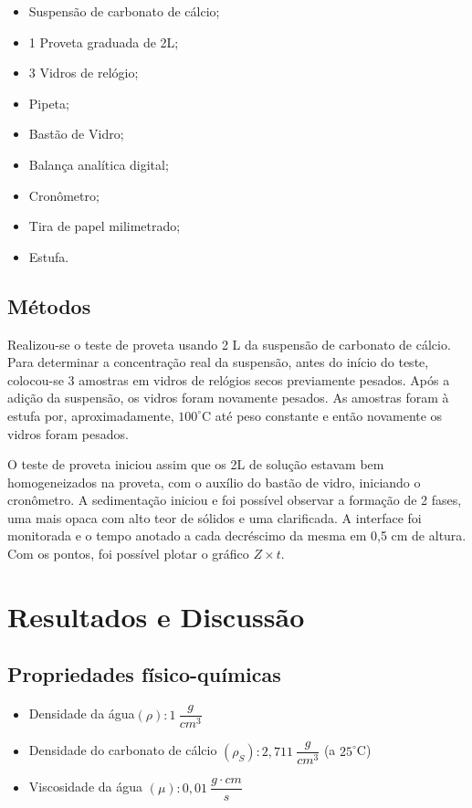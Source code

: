 \begin{itemize}
\item Suspensão de carbonato de cálcio;
\item 1 Proveta graduada de 2L;
\item 3 Vidros de relógio;
\item Pipeta;
\item Bastão de Vidro;
\item Balança analítica digital;
\item Cronômetro;
\item Tira de papel milimetrado;
\item Estufa.
\end{itemize}

\section{Métodos}

Realizou-se o teste de proveta usando 2 L da suspensão de carbonato de cálcio. Para determinar a concentração real da suspensão, antes do início do teste, colocou-se 3 amostras em vidros de relógios secos previamente pesados. Após a adição da suspensão, os vidros foram novamente pesados. As amostras foram à estufa por, aproximadamente, $ 100^{\circ} $C até peso constante e então novamente os vidros foram pesados.


O teste de proveta iniciou assim que os 2L de solução estavam bem homogeneizados na proveta, com o auxílio do bastão de vidro, iniciando o cronômetro. A sedimentação iniciou e foi possível observar a formação de 2 fases, uma mais opaca com alto teor de sólidos e uma clarificada. A interface foi monitorada e o tempo anotado a cada decréscimo da mesma em 0,5 cm de altura. Com os pontos, foi possível plotar o gráfico $ Z \times t $.




\chapter{Resultados e Discussão}

\section{Propriedades físico-químicas}

\begin{itemize}
\item Densidade da água$  (\rho): 1 \ \dfrac{g}{cm^{3}} $
\item Densidade do carbonato de cálcio $ (\rho _{S}): 2,711 \ \dfrac{g}{cm^{3}} $ (a $ 25^{\circ} $C)
\item Viscosidade da água $ (\mu): 0,01 \ \dfrac{g \cdot cm}{s}$ 
\end{itemize}




